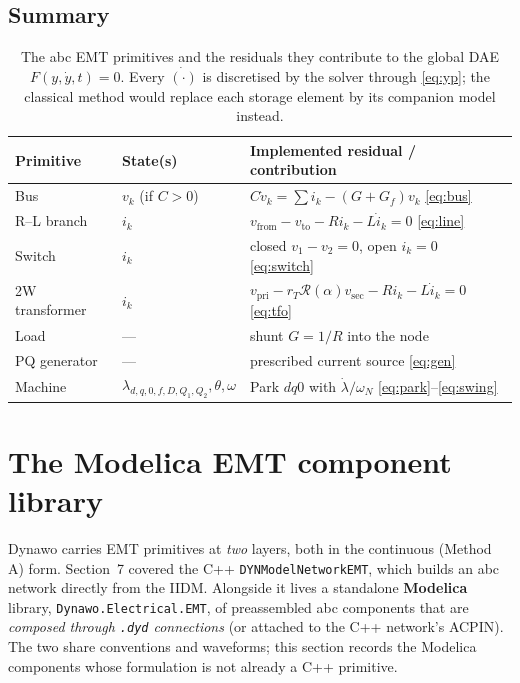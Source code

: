 \documentclass[11pt]{article}
\begin{document}
\subsection{Summary}
\begin{table}[h]
\centering
\renewcommand{\arraystretch}{1.25}
\begin{tabular}{>{\raggedright\arraybackslash}p{}
  >{\raggedright\arraybackslash}p{}
  >{\raggedright\arraybackslash}p{}}
\toprule
Primitive & State(s) & Implemented residual / contribution \\
\midrule
Bus & $v_k$ (if $C{>}0$) & $C\dot v_k=\sum i_k-(G{+}G_f)v_k$ \eqref{eq:bus} \\
R--L branch & $i_k$ & $v_{\mathrm{from}}-v_{\mathrm{to}}-Ri_k-L\dot i_k=0$ \eqref{eq:line} \\
Switch & $i_k$ & closed $v_1{-}v_2=0$, open $i_k=0$ \eqref{eq:switch} \\
2W transformer & $i_k$ & $v_{\mathrm{pri}}-r_T\mathcal R(\alpha)v_{\mathrm{sec}}-Ri_k-L\dot i_k=0$ \eqref{eq:tfo} \\
Load & --- & shunt $G=1/R$ into the node \\
PQ generator & --- & prescribed current source \eqref{eq:gen} \\
Machine & $\lambda_{d,q,0,f,D,Q_1,Q_2},\theta,\omega$ & Park $dq0$ with $\dot\lambda/\omega_N$ \eqref{eq:park}--\eqref{eq:swing} \\
\bottomrule
\end{tabular}
\caption{The abc EMT primitives and the residuals they contribute to the global
DAE $F(y,\dot y,t)=0$. Every $\dot{(\cdot)}$ is discretised by the solver through
\eqref{eq:yp}; the classical method would replace each storage element by its
companion model instead.}
\end{table}

\section{The Modelica EMT component library}

Dynawo carries EMT primitives at \emph{two} layers, both in the continuous
(Method A) form. Section~7 covered the C++ \texttt{DYNModelNetworkEMT}, which
builds an abc network directly from the IIDM. Alongside it lives a standalone
\textbf{Modelica} library, \texttt{Dynawo.Electrical.EMT}, of preassembled abc
components that are \emph{composed through \texttt{.dyd} connections} (or attached
to the C++ network's ACPIN). The two share conventions and waveforms; this
section records the Modelica components whose formulation is not already a C++
primitive.
\end{document}
